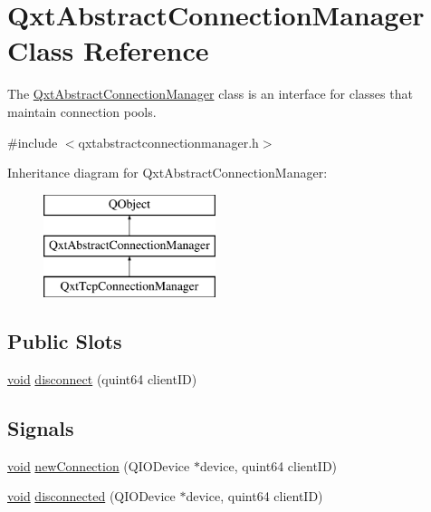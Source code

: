 \hypertarget{class_qxt_abstract_connection_manager}{\section{Qxt\-Abstract\-Connection\-Manager Class Reference}
\label{class_qxt_abstract_connection_manager}
}


The \hyperlink{class_qxt_abstract_connection_manager}{Qxt\-Abstract\-Connection\-Manager} class is an interface for classes that maintain connection pools.  




{\ttfamily \#include $<$qxtabstractconnectionmanager.\-h$>$}

Inheritance diagram for Qxt\-Abstract\-Connection\-Manager\-:\begin{figure}[H]
\begin{center}
\leavevmode
\includegraphics[height=3.000000cm]{class_qxt_abstract_connection_manager}
\end{center}
\end{figure}
\subsection*{Public Slots}
\begin{DoxyCompactItemize}
\item 
\hyperlink{group___u_a_v_objects_plugin_ga444cf2ff3f0ecbe028adce838d373f5c}{void} \hyperlink{class_qxt_abstract_connection_manager_a906c87d49b2b465d06854d7eaf29be97}{disconnect} (quint64 client\-I\-D)
\end{DoxyCompactItemize}
\subsection*{Signals}
\begin{DoxyCompactItemize}
\item 
\hyperlink{group___u_a_v_objects_plugin_ga444cf2ff3f0ecbe028adce838d373f5c}{void} \hyperlink{class_qxt_abstract_connection_manager_a6088737547b42b28b29e4f7719c3e0fc}{new\-Connection} (Q\-I\-O\-Device $\ast$device, quint64 client\-I\-D)
\item 
\hyperlink{group___u_a_v_objects_plugin_ga444cf2ff3f0ecbe028adce838d373f5c}{void} \hyperlink{class_qxt_abstract_connection_manager_a06913132eb9270d7037c26a8a045ee90}{disconnected} (Q\-I\-O\-Device $\ast$device, quint64 client\-I\-D)
\end{DoxyCompactItemize}
